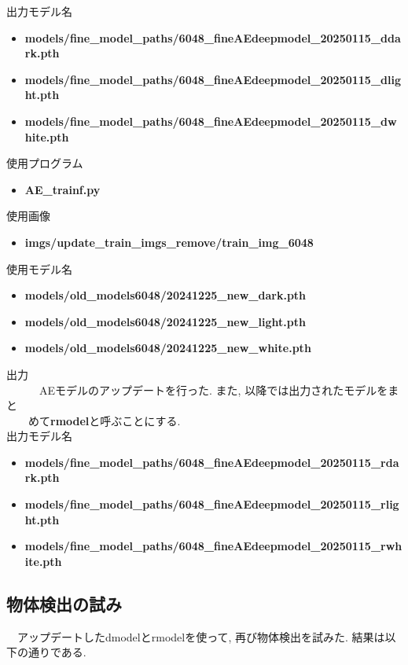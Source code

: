 \documentclass[a4paper, 12pt]{report}
\begin{document}
出力モデル名
\begin{itemize}
    \item \textbf{models/fine\_model\_paths/6048\_fineAEdeepmodel\_20250115\_ddark.pth}
    \item \textbf{models/fine\_model\_paths/6048\_fineAEdeepmodel\_20250115\_dlight.pth}
    \item \textbf{models/fine\_model\_paths/6048\_fineAEdeepmodel\_20250115\_dwhite.pth}
\end{itemize}

使用プログラム
\begin{itemize}
    \item \textbf{AE\_trainf.py}
\end{itemize}

使用画像
\begin{itemize}
    \item \textbf{imgs/update\_train\_imgs\_remove/train\_img\_6048}
\end{itemize}

使用モデル名
\begin{itemize}
    \item \textbf{models/old\_models6048/20241225\_new\_dark.pth}
    \item \textbf{models/old\_models6048/20241225\_new\_light.pth}
    \item \textbf{models/old\_models6048/20241225\_new\_white.pth}
\end{itemize}

出力\\
　　　AEモデルのアップデートを行った. また, 以降では出力されたモデルをまと\\
　　めて\textbf{rmodel}と呼ぶことにする. \\

出力モデル名
\begin{itemize}
    \item \textbf{models/fine\_model\_paths/6048\_fineAEdeepmodel\_20250115\_rdark.pth}
    \item \textbf{models/fine\_model\_paths/6048\_fineAEdeepmodel\_20250115\_rlight.pth}
    \item \textbf{models/fine\_model\_paths/6048\_fineAEdeepmodel\_20250115\_rwhite.pth}
\end{itemize}

\subsection{物体検出の試み}
　アップデートしたdmodelとrmodelを使って, 再び物体検出を試みた. 結果は以下の通りである. \\
\end{document}
